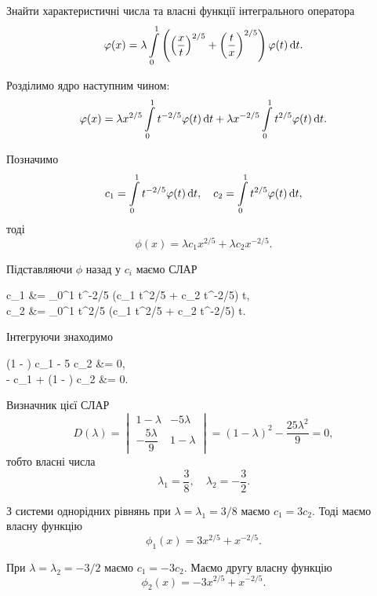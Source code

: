 \begin{example}
	Знайти характеристичні числа та власні функції інтегрального оператора 
	\begin{equation*}
		\varphi(x) = \lambda \displaystyle\int\limits_0^1 \left( \left( \dfrac{x}{t} \right)^{2/5} + \left( \dfrac{t}{x} \right)^{2/5} \right) \varphi(t) \mathop{}\!\mathrm{d} t.
	\end{equation*}
\end{example}

\begin{solution}
	Розділимо ядро наступним чином:
	\begin{equation*}
		\varphi(x) = \lambda x^{2 / 5} \displaystyle\int\limits_0^1 t^{-2/5} \varphi(t) \mathop{}\!\mathrm{d} t + \lambda x^{-2/5} \displaystyle\int\limits_0^1 t^{2/5} \varphi(t) \mathop{}\!\mathrm{d} t.
	\end{equation*}

	Позначимо
	\begin{equation*}
		c_1 = \displaystyle\int\limits_0^1 t^{-2/5} \varphi(t) \mathop{}\!\mathrm{d} t, \quad c_2 = \displaystyle\int\limits_0^1 t^{2/5} \varphi(t) \mathop{}\!\mathrm{d} t,
	\end{equation*}
	тоді
	\begin{equation*}
		\phi(x) = \lambda c_1 x^{2/5} + \lambda c_2 x^{-2/5}.
	\end{equation*}

	Підставляючи $\phi$ назад у $c_i$ маємо СЛАР
	\begin{system*}
		c_1 &= \Int_0^1 t^{-2/5} (\lambda c_1 t^{2/5} + \lambda c_2 t^{-2/5}) \diff t, \\
		c_2 &= \Int_0^1 t^{2/5} (\lambda c_1 t^{2/5} + \lambda c_2 t^{-2/5}) \diff t.
	\end{system*}

	Інтегруючи знаходимо
	\begin{system*}
		(1 - \lambda) c_1 - 5 \lambda c_2 &= 0, \\
		- c_1 + (1 - \lambda) c_2 &= 0.
	\end{system*}
	
	Визначник цієї СЛАР
	\begin{equation*}
		D(\lambda) = \begin{vmatrix} 1 - \lambda & - 5 \lambda \\ - \dfrac{5\lambda}{9} & 1 - \lambda \end{vmatrix} = (1 - \lambda)^2 - \dfrac{25\lambda^2}{9} = 0,
	\end{equation*}
	тобто власні числа
	\begin{equation*}
		\lambda_1 = \dfrac{3}{8}, \quad \lambda_2 = - \dfrac{3}{2}.
	\end{equation*}
	
	З системи однорідних рівнянь при $\lambda = \lambda_1 = 3 / 8$ маємо $c_1 = 3 c_2$. Тоді маємо власну функцію
	\begin{equation*}
		\phi_1(x) = 3 x^{2 / 5} + x^{-2 / 5}.
	\end{equation*}

	При $\lambda = \lambda_2 = - 3 / 2$ маємо $c_1 = - 3 c_2$. Маємо другу власну функцію
	\begin{equation*}
		\phi_2(x) = - 3 x^{2 / 5} + x^{-2 / 5}.
	\end{equation*}
\end{solution}

